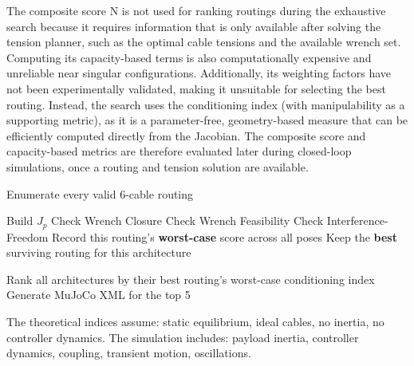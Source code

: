 The composite score N is not used for ranking routings during the exhaustive search because it requires information that is only available after solving the tension planner, such as the optimal cable tensions and the available wrench set. Computing its capacity-based terms is also computationally expensive and unreliable near singular configurations. Additionally, its weighting factors have not been experimentally validated, making it unsuitable for selecting the best routing. Instead, the search uses the conditioning index (with manipulability as a supporting metric), as it is a parameter-free, geometry-based measure that can be efficiently computed directly from the Jacobian. The composite score and capacity-based metrics are therefore evaluated later during closed-loop simulations, once a routing and tension solution are available.

\begin{algorithm}[h]
\caption{Cable Routing Optimization and Architecture Ranking}
\label{alg:cable_optimization}
\begin{algorithmic}[1]

    \State Enumerate every valid 6-cable routing
    
            \State Build $J_p$  
            \State Check Wrench Closure 
            \State Check Wrench Feasibility 
            \State Check Interference-Freedom 
        \EndFor
        \State Record this routing's \textbf{worst-case} score across all poses
    \EndFor
    \State Keep the \textbf{best} surviving routing for this architecture
\EndFor

\end{algorithmic}
\end{algorithm}


Rank all architectures by their best routing's worst-case conditioning index
Generate MuJoCo XML for the top 5



The theoretical indices assume: static equilibrium, ideal cables, no inertia, no controller dynamics.
The simulation includes: payload inertia, controller dynamics, coupling, transient motion, oscillations.

